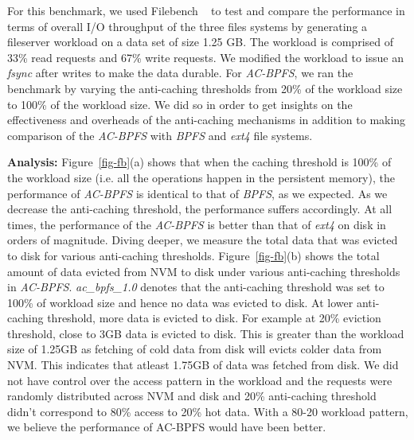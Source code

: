 For this benchmark, we used Filebench ~\cite{filebench} to test and compare the performance in terms of overall I/O throughput of the three files systems by generating a fileserver workload on a data set of size 1.25 GB. The workload is comprised of 33\% read requests and 67\% write requests. We modified the workload to issue an \textit{fsync} after writes to make the data durable. For \textit{AC-BPFS}, we ran the benchmark by varying the anti-caching thresholds from 20\% of the workload size to 100\% of the workload size. We did so in order to get insights on the effectiveness and overheads of the anti-caching mechanisms in addition to making comparison of the \textit{AC-BPFS} with \textit{BPFS} and \textit{ext4} file systems.

\textbf{Analysis:} Figure~\ref{fig-fb}(a) shows that when the caching threshold is 100\% of the workload size (i.e. all the operations happen in the persistent memory), the performance of \textit{AC-BPFS} is identical to that of \textit{BPFS}, as we expected. As we decrease the anti-caching threshold, the performance suffers accordingly. At all times, the performance of the \textit{AC-BPFS} is better than that of \textit{ext4} on disk in orders of magnitude. Diving deeper, we measure the total data that was evicted to disk for various anti-caching thresholds. Figure~\ref{fig-fb}(b) shows the total amount of data evicted from NVM to disk under various anti-caching thresholds in \textit{AC-BPFS}. \textit{ac\_bpfs\_1.0} denotes that the anti-caching threshold was set to 100\% of workload size and hence no data was evicted to disk. At lower anti-caching threshold, more data is evicted to disk. For example at 20\% eviction threshold, close to 3GB data is evicted to disk. This is greater than the workload size of 1.25GB as fetching of cold data from disk will evicts colder data from NVM. This indicates that atleast 1.75GB of data was fetched from disk. We did not have control over the access pattern in the workload and the requests were randomly distributed across NVM and disk and 20\% anti-caching threshold didn't correspond to 80\% access to 20\% hot data. With a 80-20 workload pattern, we believe the performance of AC-BPFS would have been better.
